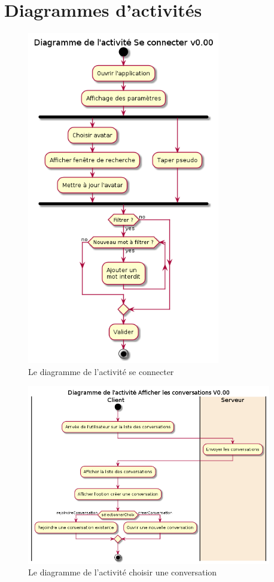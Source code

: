 \documentclass[11pt,dvipsnames,svgnames]{report}
\begin{document}
\section{Diagrammes d'activités}
\begin{figure}[H]
\centerline{\includegraphics[width=0.75\textwidth]{diagrammes/activity-settings-diag.png}}
\caption{Le diagramme de l'activité \og se connecter \fg}
\end{figure}

\begin{figure}[H]
\centerline{\includegraphics[width=0.95\textwidth]{diagrammes/activity-convList-diag.png}}
\caption{Le diagramme de l'activité \og choisir une conversation \fg}
\end{figure}
\end{document}
